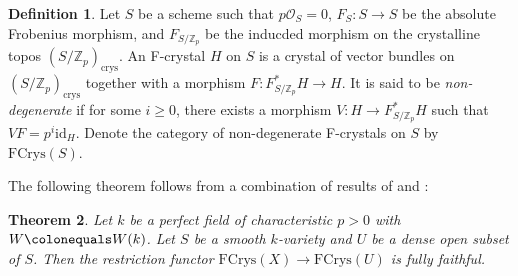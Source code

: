 \documentclass[11pt, letterpaper]{amsart}
\theoremstyle{plain}
\newtheorem{theorem}{Theorem}[section]
\theoremstyle{definition}
\newtheorem{definition}[theorem]{Definition}
\newcommand{\IZ}{\mathbb{Z}}
\newcommand{\<}{\langle}
\renewcommand{\>}{\rangle}
\newcommand{\sO}{\mathcal{O}}
\newcommand{\crys}{\mathrm{crys}}
\newcommand{\FCrys}{\mathrm{FCrys}}
\begin{document}
\begin{definition}
    Let $S$ be a scheme such that $p \sO_S = 0$, $F_S : S \to S$ be the absolute Frobenius morphism, and $F_{S/\IZ_p}$ be the inducded morphism on the crystalline topos $(S/\IZ_p)_\crys$. An F-crystal $H$ on $S$ is a crystal of vector bundles on $(S/\IZ_p)_\crys$ together with a morphism $F : F_{S/\IZ_p}^* H \to H$. It is said to be \textit{non-degenerate} if for some $i \ge 0$, there exists a morphism $V : H \to F^*_{S/ \IZ_p} H$ such that $VF = p^i \mathrm{id}_H$. Denote the category of non-degenerate F-crystals on $S$ by $\FCrys(S)$.   
\end{definition}

The following theorem follows from a combination of results of \cite{deJong} and \cite{DK17}: 

\begin{theorem}
\label{lem: rigidity of F-crystals}
Let $k$ be a perfect field of characteristic $p > 0$ with $W \colonequals W(k)$. Let $S$ be a smooth $k$-variety and $U$ be a dense open subset of $S$. Then the restriction functor $\FCrys(X) \to \FCrys(U)$ is fully faithful. 
\end{theorem}
\end{document}

